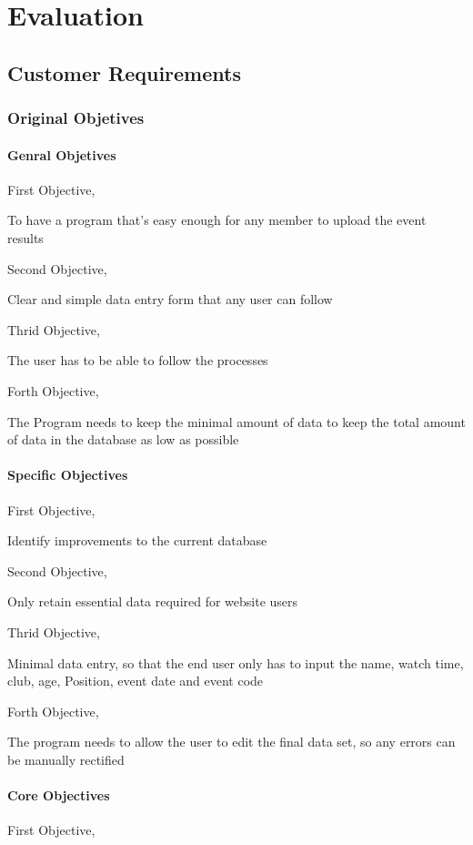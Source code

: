\chapter{Evaluation}

\section{Customer Requirements}

\subsection{Original Objetives}

\subsubsection{Genral Objetives}
First Objective,

To have a program that's easy enough for any member to upload the event results

Second Objective,

Clear and simple data entry form that any user can follow

Thrid Objective,

The user has to be able to follow the processes

Forth Objective,

The Program needs to keep the minimal amount of data to keep the total amount of data in the database as low as possible


\subsubsection{Specific Objectives}
First Objective,

Identify improvements to the current database

Second Objective,

Only retain essential data required for website users

Thrid Objective,

Minimal data entry, so that the end user only has to input the name, watch time, club, age, Position, event date and event code

Forth Objective,

The program needs to allow the user to edit the final data set, so any errors can be manually rectified


\subsubsection{Core Objectives}
First Objective,

